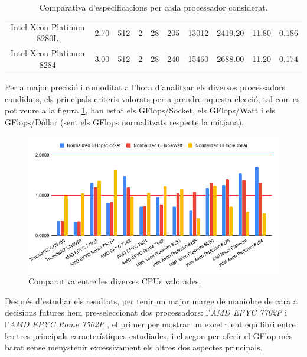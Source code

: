 \begin{table}[H]
\begin{adjustwidth}{-1.0in}{-1.0in}
\begin{center}
{\begin{tabular}{c||c|c|c|c|c|c|c|c|c}
Intel Xeon Platinum 8280L & 2.70       & 512                                                       & 2                                                        & 28    & 205   & 13012      & 2419.20       & 11.80       & 0.186         \\
\rowcolor[HTML]{EFEFEF} 
Intel Xeon Platinum 8284  & 3.00       & 512                                                       & 2                                                        & 28    & 240   & 15460      & 2688.00       & 11.20       & 0.174         \\ \hline 
\end{tabular}
}
    \caption{Comparativa d'especificacions per cada processador considerat.}
    \label{tab:cpu_cmp}
    \end{center}
    \end{adjustwidth}
\end{table}

Per a major precisió i comoditat a l'hora d'analitzar els diversos processadors candidats, els principals criteris valorats per a prendre aquesta elecció, tal com es pot veure a la figura \ref{chartCPUs}, han estat els GFlops/Socket, els GFlops/Watt i els GFlops/Dòllar (sent els GFlops normalitzats respecte la mitjana). 

\begin{figure}[H]
    \centering
    \includegraphics[width=\textwidth]{img/chartCPU}
    \caption{Comparativa entre les diverses CPUs valorades.}
    \label{chartCPUs}
\end{figure}

Després d'estudiar els resultats, per tenir un major marge de maniobre de cara a decisions futures hem pre-seleccionat dos processadors: l'\textit{AMD EPYC 7702P} \cite{cpu_amd_7702_buy} i l'\textit{AMD EPYC Rome 7502P} \cite{cpu_amd_7502_buy}, el primer per mostrar un excel·lent equilibri entre les tres principals característiques estudiades, i el segon per oferir el GFlop més barat sense menystenir excessivament els altres dos aspectes principals.
